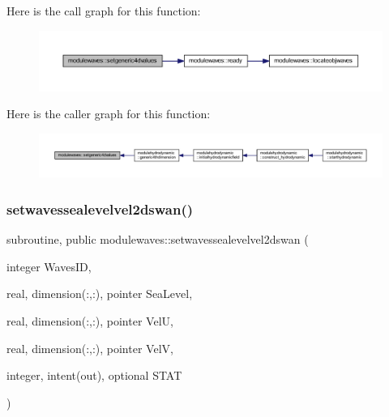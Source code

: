 Here is the call graph for this function\+:\nopagebreak
\begin{figure}[H]
\begin{center}
\leavevmode
\includegraphics[width=350pt]{namespacemodulewaves_a27286ddaee0e46cf76c86b80a35ee9ad_cgraph}
\end{center}
\end{figure}
Here is the caller graph for this function\+:\nopagebreak
\begin{figure}[H]
\begin{center}
\leavevmode
\includegraphics[width=350pt]{namespacemodulewaves_a27286ddaee0e46cf76c86b80a35ee9ad_icgraph}
\end{center}
\end{figure}
\mbox{\label{namespacemodulewaves_aa5ff8156c82807bd7134751bf6b90824}} 
\subsubsection{\texorpdfstring{setwavessealevelvel2dswan()}{setwavessealevelvel2dswan()}}
{\footnotesize\ttfamily subroutine, public modulewaves\+::setwavessealevelvel2dswan (\begin{DoxyParamCaption}\item[{integer}]{Waves\+ID,  }\item[{real, dimension(\+:,\+:), pointer}]{Sea\+Level,  }\item[{real, dimension(\+:,\+:), pointer}]{VelU,  }\item[{real, dimension(\+:,\+:), pointer}]{VelV,  }\item[{integer, intent(out), optional}]{S\+T\+AT }\end{DoxyParamCaption})}

